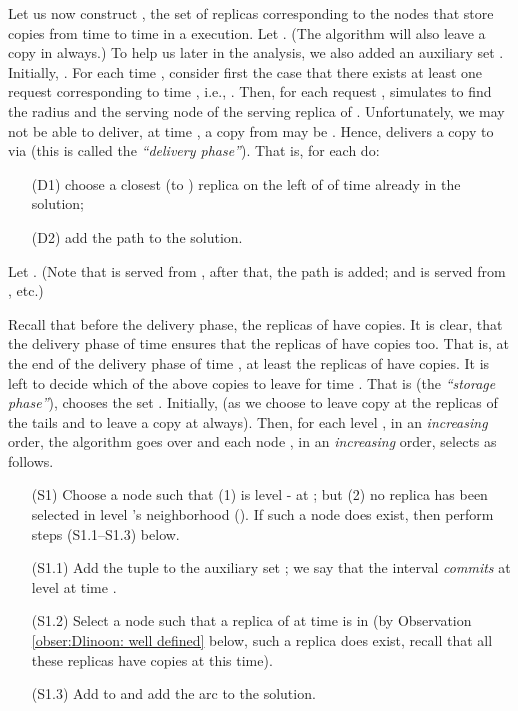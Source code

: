 \documentclass[11pt]{article}
\begin{document}
Let us now construct , the set of replicas corresponding to the nodes that store copies from time  to time  in a  execution.
Let .
(The algorithm will also leave a copy in  always.)
To help us later in the analysis, we also added an auxiliary set
.
Initially, .
For each time , consider first the case that there exists at least one request corresponding to time , i.e., .
Then, for each request ,
 simulates  to find the radius  and the serving node  of the serving replica  of .
Unfortunately, we may not be able to deliver, at time , a copy from  may be .
Hence,  delivers a copy to  via  (this is called the {\em ``delivery phase''}).
That is, for each  do:
\begin{itemize}
\item[(D1)] choose a closest (to ) replica 
on the left of   of time  already in the solution;

\item[(D2)] add the path 
to the solution.

\end{itemize}
Let .
(Note that  is served from , after that, the path  is added; and  is served from , etc.)


Recall that before the delivery phase, the replicas of  have copies.
It is clear, that the delivery phase of time  ensures that the replicas of  have copies too.
That is, at the end of the delivery phase of time , at least the replicas of  have copies.
It is left to decide which of the above copies to leave for time .
That is (the {\em ``storage phase''}),
 chooses the set
.
Initially,  (as we choose to leave copy at the replicas of the tails and to leave a copy at  always).
Then, for each level , in an {\em increasing} order, the algorithm goes over and
each node , in an {\em increasing} order, selects as follows.
\begin{itemize}
\item[(S1)] Choose a node  such that
(1)  is level - at ; but
(2) no replica has been selected in level  's neighborhood ().
If such a node  does exist, then perform steps (S1.1--S1.3) below.

\item[(S1.1)] Add the tuple  to the auxiliary set ;
we say that the interval  {\em commits} at level  at time .

\item[(S1.2)]
Select a node  such that a replica of  at time  is in
 (by Observation \ref{obser:Dlinoon: well defined} below, such a replica does exist,
recall that all these replicas have copies at this time).
\item[(S1.3)] Add   to  and add the arc  to the solution.

\end{itemize}
\end{document}

